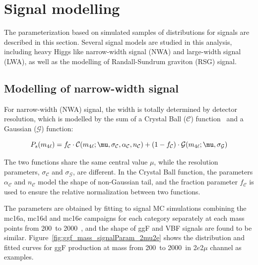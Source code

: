 \section{Signal modelling}

The parameterization based on simulated samples of \mfl distributions for signals are described in this section.
Several signal models are studied in this analysis, including heavy Higgs like narrow-width signal (NWA) and large-width signal (LWA), as well as the modelling of Randall-Sundrum graviton (RSG) signal.


\subsection{Modelling of narrow-width signal}
\label{sec:signal_nwa}

For narrow-width (NWA) signal, the \mfl width is totally determined by detector resolution, which is modelled 
by the sum of a Crystal Ball ($\mathcal{C}$) function~\cite{CrystalBall1,CrystalBall2} and a Gaussian ($\mathcal{G}$) function:

\begin{equation}
    \label{eq:cb_plus_g}
    P_{s} (\mfl) = f_{\mathcal{C}} \cdot \mathcal{C}(\mfl; \mu, \sigma_{\mathcal{C}}, \alpha_{\mathcal{C}}, n_{\mathcal{C}})
                   + (1 - f_{\mathcal{C}}) \cdot \mathcal{G}(\mfl; \mu, \sigma_{\mathcal{G}})
\end{equation}

The two functions share the same central value $\mu$, while the resolution parameters, $\sigma_{\mathcal{C}}$ and $\sigma_{\mathcal{G}}$, are different.
In the Crystal Ball function, the parameters $\alpha_{\mathcal{C}}$ and $n_{\mathcal{C}}$ model the shape of non-Gaussian tail,
and the fraction parameter $f_{\mathcal{C}}$ is used to ensure the relative normalization between two functions.

The parameters are obtained by fitting to signal MC simulations combining the mc16a, mc16d and mc16e campaigns for each category separately at each mass points from 200~\gev to 2000~\gev,
and the shape of ggF and VBF signals are found to be similar.
Figure~\ref{fig:ggf_mass_signalParam_2mu2e} shows the \mfl distribution and fitted curves for ggF production at mass from 200~\gev to 2000~\gev in 2$e$2$\mu$ channel as examples.

